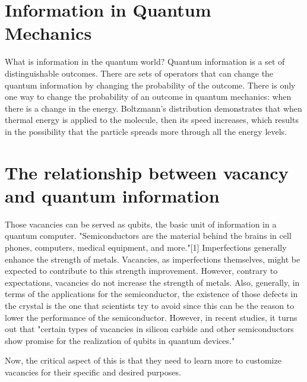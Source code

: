\documentclass{article}
\begin{document}
\section{Information in Quantum Mechanics}
What is information in the quantum world? 
Quantum information is a set of distinguishable outcomes.
There are sets of operators that can change the quantum information by changing the probability of the outcome.
There is only one way to change the probability of an outcome in quantum mechanics: when there is a change in the energy.
Boltzmann's distribution demonstrates that when thermal energy is applied to the molecule, 
then its speed increases, which results in the possibility that the particle spreads more through all the energy levels.  

\section{The relationship between vacancy and quantum information}
Those vacancies can be served as qubits, the basic unit of information in a quantum computer. 
"Semiconductors are the material behind the brains in cell phones, computers, medical equipment, and more."[1] 
Imperfections generally enhance the strength of metals. 
Vacancies, as imperfections themselves, might be expected to contribute to this strength improvement. 
However, contrary to expectations, vacancies do not increase the strength of metals.
Also, generally, in terms of the applications for the semiconductor, the existence of those defects in the crystal is the one that scientists try to avoid since this can be the reason to lower the performance of the semiconductor. 
However, in recent studies, it turns out that "certain types of vacancies in silicon carbide and other semiconductors show promise for the realization of qubits in quantum devices." 

Now, the critical aspect of this is that they need to learn more to customize vacancies for their specific and desired purposes. 
\end{document}
